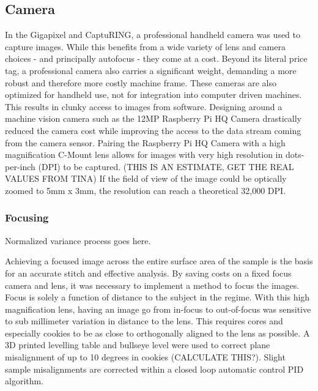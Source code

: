 \documentclass[a4paper,12pt]{article}
\begin{document}
\subsection{Camera}
In the Gigapixel and CaptuRING, a professional handheld camera was used to capture images. While this benefits from a wide variety of lens and camera choices - and principally autofocus - they come at a cost. 
Beyond its literal price tag, a professional camera also carries a significant weight, demanding a more robust and therefore more costly machine frame. 
These cameras are also optimized for handheld use, not for integration into computer driven machines. This results in clunky access to images from software. 
Designing around a machine vision camera such as the 12MP Raspberry Pi HQ Camera drastically reduced the camera cost while improving the access to the data stream coming from the camera sensor.
Pairing the Raspberry Pi HQ Camera with a high magnification C-Mount lens allows for images with very high resolution in dots-per-inch (DPI) to be captured. (THIS IS AN ESTIMATE, GET THE REAL VALUES FROM TINA) If the field of view of the image
could be optically zoomed to 5mm x 3mm, the resolution can reach a theoretical 32,000 DPI. 

\subsubsection{Focusing}
Normalized variance process goes here.

Achieving a focused image across the entire surface area of the sample is the basis for an accurate stitch and effective analysis. By saving costs on a fixed focus camera and lens, it was necessary to implement a method to focus the images. 
Focus is solely a function of distance to the subject in the regime. With this high magnification lens, having an image go from in-focus to out-of-focus was sensitive to sub millimeter variation in distance to the lens. 
This requires cores and especially cookies to be as close to orthogonally aligned to the lens as possible. A 3D printed levelling table and bullseye level were used to correct plane misalignment of up to 10 degrees in cookies (CALCULATE THIS?). 
Slight sample misalignments are corrected within a closed loop automatic control PID algorithm. 


\end{document}
